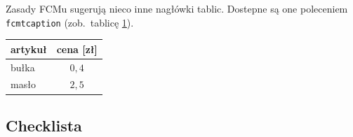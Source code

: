 Zasady FCMu sugerują nieco inne nagłówki tablic. Dostepne są one poleceniem \texttt{fcmtcaption} (zob.~tablicę
\ref{tab:tabela2}).

\begin{table}[ht]
\label{tab:tabela2}
\centering\footnotesize%
\begin{tabular}{l c}
\toprule
artykuł & cena [zł] \\
\midrule
bułka   & $0,4$ \\
masło   & $2,5$ \\
\bottomrule
\end{tabular}
\end{table}


\subsection{Checklista}

